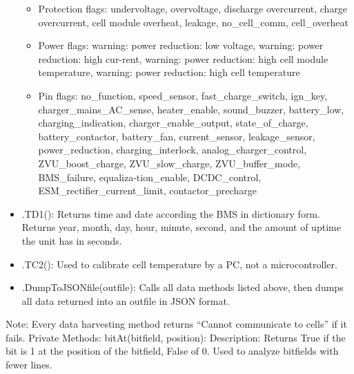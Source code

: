 \begin{itemize}
\begin{itemize}
		\item Protection flags: undervoltage, overvoltage, discharge overcurrent, charge overcurrent, cell module overheat, leakage, no\_cell\_comm, cell\_overheat
		\item Power flags: warning: power reduction: low voltage, warning: power reduction: high cur-rent, warning: power reduction: high cell module temperature,  warning: power reduction: high cell temperature
		\item Pin flags: no\_function, speed\_sensor, fast\_charge\_switch, ign\_key, charger\_mains\_AC\_sense, heater\_enable, sound\_buzzer, battery\_low, charging\_indication, charger\_enable\_output, state\_of\_charge, battery\_contactor, battery\_fan, current\_sensor, leakage\_sensor, power\_reduction, charging\_interlock, analog\_charger\_control, ZVU\_boost\_charge, ZVU\_slow\_charge, ZVU\_buffer\_mode, BMS\_failure, equaliza-tion\_enable, DCDC\_control, ESM\_rectifier\_current\_limit, contactor\_precharge
	\end{itemize}
	\item .TD1(): Returns time and date according the BMS in dictionary form. Returns year, month, day, hour, minute, second, and the amount of uptime the unit has in seconds.
	\item .TC2(): Used to calibrate cell temperature by a PC, not a microcontroller.
	\item .DumpToJSONfile(outfile): Calls all data methods listed above, then dumps all data returned into an outfile in JSON format.
\end{itemize}
Note: Every data harvesting method returns “Cannot communicate to cells” if it fails.
Private Methods:
bitAt(bitfield, position): 
Description:
Returns True if the bit is 1 at the position of the bitfield, False of 0. Used to analyze bitfields with fewer lines.
